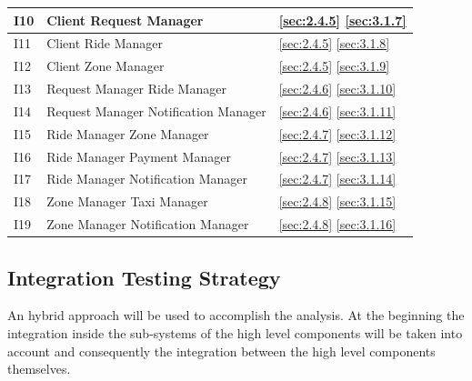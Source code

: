 \documentclass[a4paper,11pt]{report} %
\begin{document}
\begin{center}
\begin{tabular}{ l | p{7cm} | p{5cm} }
					 I10 & Client \textrightarrow Request Manager & \ref{sec:2.4.5} \hspace{25pt} \ref{sec:3.1.7}\\\hline					 					 				
					 I11 & Client \textrightarrow Ride Manager & \ref{sec:2.4.5} \hspace{25pt} \ref{sec:3.1.8}\\\hline					 					 					 	
					 I12 & Client \textrightarrow Zone Manager & \ref{sec:2.4.5} \hspace{25pt} \ref{sec:3.1.9}\\\hline					 					 					 	
					 I13 & Request Manager \textrightarrow Ride Manager & \ref{sec:2.4.6} \hspace{25pt} \ref{sec:3.1.10}\\\hline		
					 I14 & Request Manager \textrightarrow Notification Manager & \ref{sec:2.4.6} \hspace{25pt} \ref{sec:3.1.11}\\\hline					 					 					 					
					 I15 & Ride Manager \textrightarrow Zone Manager & \ref{sec:2.4.7} \hspace{25pt} \ref{sec:3.1.12}\\\hline					 					 					 	
					 I16 & Ride Manager \textrightarrow Payment Manager & \ref{sec:2.4.7} \hspace{25pt} \ref{sec:3.1.13}\\\hline					 	 			 				
					 I17 & Ride Manager \textrightarrow Notification Manager & \ref{sec:2.4.7}  \hspace{25pt} \ref{sec:3.1.14}\\\hline					 					 					 		 					 	
					 I18 & Zone Manager \textrightarrow Taxi Manager & \ref{sec:2.4.8} \hspace{25pt} \ref{sec:3.1.15}\\\hline					 					 					 	
					 I19 & Zone Manager \textrightarrow Notification Manager & \ref{sec:2.4.8}  \hspace{25pt} \ref{sec:3.1.16}\\\hline
				\end{tabular}
			\end{center}			
	\subsection{Integration Testing Strategy}
		An hybrid approach will be used to accomplish the analysis. At the beginning the integration inside the sub-systems of the high level components will be taken into account and consequently the integration between the high level components themselves.
\end{document}
